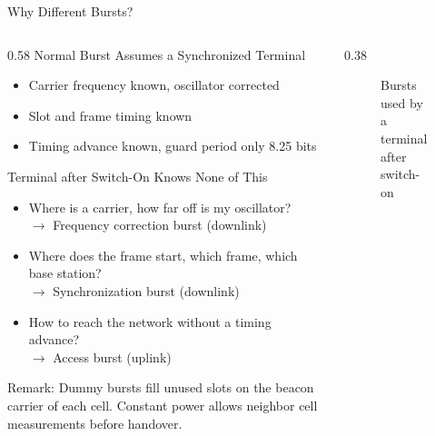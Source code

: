 \begin{frame}{Why Different Bursts?}
  \begin{columns}[T,onlytextwidth]
    \begin{column}{0.58\textwidth}
      Normal Burst Assumes a Synchronized Terminal
      \begin{itemize}
        \item Carrier frequency known, oscillator corrected
        \item Slot and frame timing known
        \item Timing advance known, guard period only \num{8.25} bits
      \end{itemize}
      \vspace{0.4em}
      Terminal after Switch-On Knows None of This
      \begin{itemize}
        \item Where is a carrier, how far off is my oscillator?\\
          $\rightarrow$ Frequency correction burst (downlink)
        \item Where does the frame start, which frame, which base station?\\
          $\rightarrow$ Synchronization burst (downlink)
        \item How to reach the network without a timing advance?\\
          $\rightarrow$ Access burst (uplink)
      \end{itemize}
      \alert{Remark:} Dummy bursts fill unused slots on the beacon carrier of each cell. Constant power allows neighbor cell measurements before handover.
    \end{column}
    \begin{column}{0.38\textwidth}
      \begin{figure}
        \centering
        
        \caption{Bursts used by a terminal after switch-on}
      \end{figure}
    \end{column}
  \end{columns}
\end{frame}

